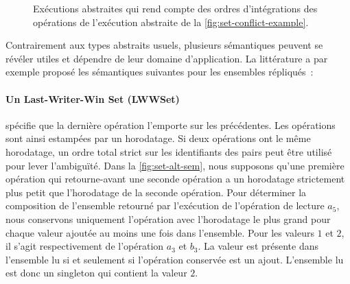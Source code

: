 \begin{figure}[htb]
\begin{subfigure}{\linewidth}
    \caption{}
\end{subfigure}
\caption[Impact d'ordres distincts d'intégration des opérations de modification sur un ensemble répliqué]{Exécutions abstraites qui rend compte des ordres d'intégrations des opérations de l'exécution abstraite de la \autoref{fig:set-conflict-example}.}\label{fig:spec-linearization}
\end{figure}

Contrairement aux types abstraits usuels, plusieurs sémantiques peuvent se révéler utiles et dépendre de leur domaine d'application.
La littérature a par exemple proposé les sémantiques suivantes pour les ensembles répliqués~:

\paragraph{Un Last-Writer-Win Set (LWWSet)~\autocite{shapiro2011_comprehensive}} spécifie que la dernière opération l'emporte sur les précédentes. Les opérations sont ainsi estampées par un horodatage.
Si deux opérations ont le même horodatage, un ordre total strict sur les identifiants des pairs peut être utilisé pour lever l'ambiguïté.
Dans la \autoref{fig:set-alt-sem}, nous supposons qu'une première opération qui retourne-avant une seconde opération a un horodatage strictement plus petit que l'horodatage de la seconde opération.
Pour déterminer la composition de l'ensemble retourné par l'exécution de l'opération de lecture $a_5$, nous conservons uniquement l'opération avec l'horodatage le plus grand pour chaque valeur ajoutée au moins une fois dans l'ensemble.
Pour les valeurs $1$ et $2$, il s'agit respectivement de l'opération $a_3$ et $b_3$.
La valeur est présente dans l'ensemble lu si et seulement si l'opération conservée est un ajout.
L'ensemble lu est donc un singleton qui contient la valeur $2$.

